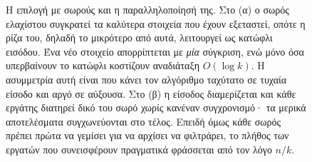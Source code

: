 \begin{figure}[H]
    \caption[Επιλογή με σωρούς και σχήμα ]{Η επιλογή με σωρούς και η παραλληλοποίησή της. Στο (α) ο σωρός
    ελαχίστου συγκρατεί τα  καλύτερα στοιχεία που έχουν εξεταστεί, οπότε η
    ρίζα του, δηλαδή το μικρότερο από αυτά, λειτουργεί ως κατώφλι εισόδου. Ένα
    νέο στοιχείο απορρίπτεται με \emph{μία} σύγκριση, ενώ μόνο όσα υπερβαίνουν το
    κατώφλι κοστίζουν αναδιάταξη $O(\log k)$. Η ασυμμετρία αυτή είναι που κάνει
    τον αλγόριθμο ταχύτατο σε τυχαία είσοδο και αργό σε αύξουσα. Στο (β) η
    είσοδος διαμερίζεται και κάθε εργάτης διατηρεί δικό του σωρό χωρίς κανέναν
    συγχρονισμό· τα μερικά αποτελέσματα συγχωνεύονται στο τέλος. Επειδή όμως κάθε
    σωρός πρέπει πρώτα να γεμίσει για να αρχίσει να φιλτράρει, το πλήθος των
    εργατών που συνεισφέρουν πραγματικά φράσσεται από τον λόγο $n/k$.}
    \label{fig:bg-heap}
\end{figure}
